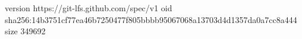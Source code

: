 version https://git-lfs.github.com/spec/v1
oid sha256:14b3751cf77ea46b7250477f805bbbb95067068a13703d4d1357da0a7cc8a444
size 349692
